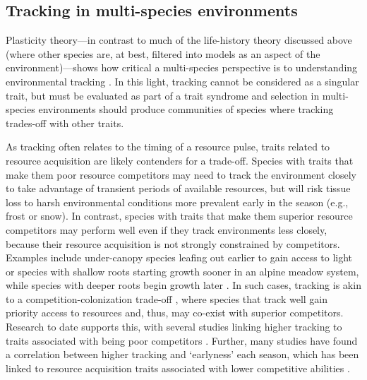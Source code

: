 \documentclass[11pt,letterpaper]{article}
\begin{document}
\subsection{Tracking in multi-species environments} %
Plasticity theory---in contrast to much of the life-history theory discussed above (where other species are, at best, filtered into models as an aspect of the environment)---shows how critical a multi-species perspective is to understanding environmental tracking \citep{metcalf2015}. In this light, tracking cannot be considered as a singular trait, but must be evaluated as part of a trait syndrome \citep[or mosaic of traits,][]{Ghalambor2007} and selection in multi-species environments should produce communities of species where tracking trades-off with other traits. 

As tracking often relates to the timing of a resource pulse, traits related to resource acquisition are likely contenders for a trade-off. Species with traits that make them poor resource competitors may need to track the environment closely to take advantage of transient periods of available resources, but will risk tissue loss to harsh environmental conditions more prevalent early in the season (e.g., frost or snow). In contrast, species with traits that make them superior resource competitors may perform well even if they track environments less closely, because their resource acquisition is not strongly constrained by competitors. Examples include under-canopy species leafing out earlier to gain access to light \citep{heberling2019} or species with shallow roots starting growth sooner in an alpine meadow system, while species with deeper roots begin growth later \citep{Zhu2016BioLetters}. In such cases, tracking is akin to a competition-colonization trade-off \citep{Amarasekare:2003tq}, where species that track well gain priority access to resources and, thus, may co-exist with superior competitors. Research to date supports this, with several studies linking higher tracking to traits associated with being poor competitors \citep{Dorji2013,lasky2016,Zhu2016BioLetters}. Further, many studies have found a correlation between higher tracking and `earlyness' each season, which has been linked to resource acquisition traits associated with lower competitive abilities \citep[][see Box `Trait trade-offs with tracking']{wolkovich2014aob}. 
\end{document}
